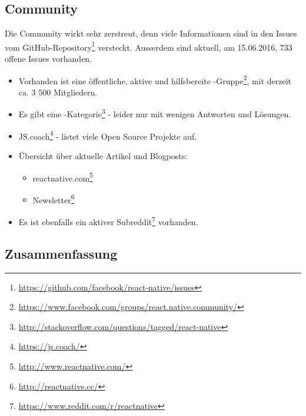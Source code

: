 \subsection{Community}
Die Community wirkt sehr zerstreut, denn viele Informationen sind in den Issues vom  GitHub-Repository\footnote{\url{https://github.com/facebook/react-native/issues}} versteckt.
Ausserdem sind aktuell, am 15.06.2016, 733 offene Issues vorhanden.

\begin{itemize}
	\item Vorhanden ist eine öffentliche, aktive und hilfsbereite -Gruppe\footnote{\url{https://www.facebook.com/groups/react.native.community/}}, mit derzeit ca. 3 500 Mitgliedern.
	\item Es gibt eine -Kategorie\footnote{\url{http://stackoverflow.com/questions/tagged/react-native}} - leider nur mit wenigen Antworten und Lösungen.
	\item JS.coach\footnote{\url{https://js.coach/}} - listet viele Open Source Projekte auf.
	\item Übersicht über aktuelle Artikel und Blogposts: 
	\begin{itemize}
		\item reactnative.com\footnote{\url{http://www.reactnative.com/}}
		\item {} Newsletter\footnote{\url{http://reactnative.cc/}}
	\end{itemize}
	\item Es ist ebenfalls ein aktiver Subreddit\footnote{\url{https://www.reddit.com/r/reactnative}} vorhanden.
\end{itemize}


\subsection{Zusammenfassung}


